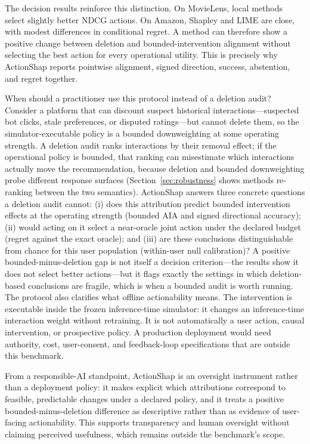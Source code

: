 \documentclass[manuscript,screen,review,anonymous]{acmart}
\begin{document}
The decision results reinforce this distinction. On MovieLens, local methods select slightly better NDCG actions. On Amazon, Shapley and LIME are close, with modest differences in conditional regret. A method can therefore show a positive change between deletion and bounded-intervention alignment without selecting the best action for every operational utility. This is precisely why ActionShap reports pointwise alignment, signed direction, success, abstention, and regret together.

When should a practitioner use this protocol instead of a deletion audit? Consider a platform that can discount suspect historical interactions---suspected bot clicks, stale preferences, or disputed ratings---but cannot delete them, so the simulator-executable policy is a bounded downweighting at some operating strength. A deletion audit ranks interactions by their removal effect; if the operational policy is bounded, that ranking can misestimate which interactions actually move the recommendation, because deletion and bounded downweighting probe different response surfaces (Section~\ref{sec:robustness} shows methods re-ranking between the two semantics). ActionShap answers three concrete questions a deletion audit cannot: (i) does this attribution predict bounded intervention effects at the operating strength (bounded AIA and signed directional accuracy); (ii) would acting on it select a near-oracle joint action under the declared budget (regret against the exact oracle); and (iii) are these conclusions distinguishable from chance for this user population (within-user null calibration)? A positive bounded-minus-deletion gap is not itself a decision criterion---the results show it does not select better actions---but it flags exactly the settings in which deletion-based conclusions are fragile, which is when a bounded audit is worth running.
The protocol also clarifies what offline actionability means. The intervention is executable inside the frozen inference-time simulator: it changes an inference-time interaction weight without retraining. It is not automatically a user action, causal intervention, or prospective policy. A production deployment would need authority, cost, user-consent, and feedback-loop specifications that are outside this benchmark.

From a responsible-AI standpoint, ActionShap is an oversight instrument rather than a deployment policy: it makes explicit which attributions correspond to feasible, predictable changes under a declared policy, and it treats a positive bounded-minus-deletion difference as descriptive rather than as evidence of user-facing actionability. This supports transparency and human oversight without claiming perceived usefulness, which remains outside the benchmark's scope.
\end{document}
